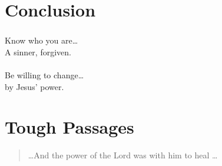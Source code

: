 \section*{Conclusion}
\begin{frame}
\frametitle{}
Know who you are\ldots\\
A sinner, forgiven.\\~\\
Be willing to change\ldots\\
by Jesus' power.

\end{frame}

\section*{Tough Passages}

\begin{frame}
\begin{quote}
\dots And the power of the Lord was with him to heal \dots

\end{quote}

\end{frame}
